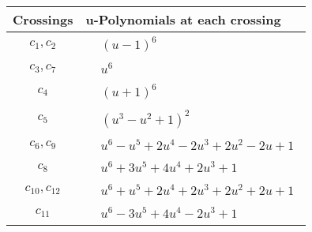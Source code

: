 \documentclass[1p]{elsarticle_modified}
\theoremstyle{definition}
\begin{document}
\begin{tabular}{m{50pt}|m{274pt}}
Crossings & \hspace{64pt}u-Polynomials at each crossing \\
\hline $$\begin{aligned}c_{1},c_{2}\end{aligned}$$&$\begin{aligned}
&(u-1)^6
\end{aligned}$\\
\hline $$\begin{aligned}c_{3},c_{7}\end{aligned}$$&$\begin{aligned}
&u^6
\end{aligned}$\\
\hline $$\begin{aligned}c_{4}\end{aligned}$$&$\begin{aligned}
&(u+1)^6
\end{aligned}$\\
\hline $$\begin{aligned}c_{5}\end{aligned}$$&$\begin{aligned}
&(u^3- u^2+1)^2
\end{aligned}$\\
\hline $$\begin{aligned}c_{6},c_{9}\end{aligned}$$&$\begin{aligned}
&u^6- u^5+2 u^4-2 u^3+2 u^2-2 u+1
\end{aligned}$\\
\hline $$\begin{aligned}c_{8}\end{aligned}$$&$\begin{aligned}
&u^6+3 u^5+4 u^4+2 u^3+1
\end{aligned}$\\
\hline $$\begin{aligned}c_{10},c_{12}\end{aligned}$$&$\begin{aligned}
&u^6+u^5+2 u^4+2 u^3+2 u^2+2 u+1
\end{aligned}$\\
\hline $$\begin{aligned}c_{11}\end{aligned}$$&$\begin{aligned}
&u^6-3 u^5+4 u^4-2 u^3+1
\end{aligned}$\\
\hline
\end{tabular}\\~\\
\end{document}
